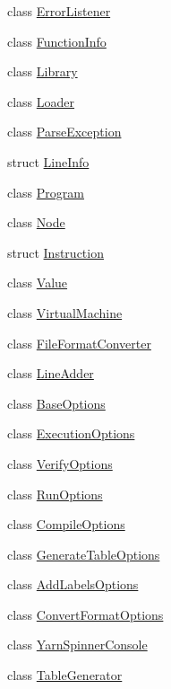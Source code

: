 \begin{DoxyCompactItemize}
class \hyperlink{a00096}{Error\-Listener}
\item 
class \hyperlink{a00101}{Function\-Info}
\item 
class \hyperlink{a00121}{Library}
\item 
class \hyperlink{a00125}{Loader}
\item 
class \hyperlink{a00135}{Parse\-Exception}
\item 
struct \hyperlink{a00123}{Line\-Info}
\item 
class \hyperlink{a00138}{Program}
\item 
class \hyperlink{a00048_a00351}{Node}
\item 
struct \hyperlink{a00113}{Instruction}
\item 
class \hyperlink{a00165}{Value}
\item 
class \hyperlink{a00145}{Virtual\-Machine}
\item 
class \hyperlink{a00100}{File\-Format\-Converter}
\item 
class \hyperlink{a00122}{Line\-Adder}
\item 
class \hyperlink{a00040}{Base\-Options}
\item 
class \hyperlink{a00099}{Execution\-Options}
\item 
class \hyperlink{a00169}{Verify\-Options}
\item 
class \hyperlink{a00142}{Run\-Options}
\item 
class \hyperlink{a00052}{Compile\-Options}
\item 
class \hyperlink{a00102}{Generate\-Table\-Options}
\item 
class \hyperlink{a00039}{Add\-Labels\-Options}
\item 
class \hyperlink{a00055}{Convert\-Format\-Options}
\item 
class \hyperlink{a00172}{Yarn\-Spinner\-Console}
\item 
class \hyperlink{a00151}{Table\-Generator}
\end{DoxyCompactItemize}
